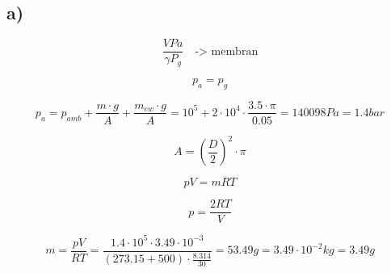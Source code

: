 

\subsection*{a)}

\[
\frac{VPa}{\gamma P_{g}} \quad \text{-> membran}
\]

\[
p_a = p_g
\]

\[
p_a = p_{amb} + \frac{m \cdot g}{A} + \frac{m_{ew} \cdot g}{A} = 10^5 + 2 \cdot 10^4 \cdot \frac{3.5 \cdot \pi}{0.05} = 140098 Pa = 1.4 bar
\]

\[
A = \left(\frac{D}{2}\right)^2 \cdot \pi
\]

\[
pV = mRT
\]

\[
p = \frac{2RT}{V}
\]

\[
m = \frac{pV}{RT} = \frac{1.4 \cdot 10^5 \cdot 3.49 \cdot 10^{-3}}{(273.15 + 500) \cdot \frac{8.314}{30}} = 53.49 g = 3.49 \cdot 10^{-2} kg = 3.49 g
\]